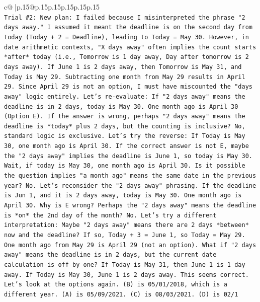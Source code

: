 \documentclass{article}
\begin{document}
{\begin{supertabular}{c@{$\;$}|p{.15\linewidth}@{}p{.15\linewidth}p{.15\linewidth}p{.15\linewidth}p{.15\linewidth}p{.15\linewidth}}
{{{\\ 
\texttt{Trial \#2: New plan: I failed because I misinterpreted the phrase "2 days away." I assumed it meant the deadline is on the second day from today (Today + 2 = Deadline), leading to Today = May 30. However, in date arithmetic contexts, "X days away" often implies the count starts *after* today (i.e., Tomorrow is 1 day away, Day after tomorrow is 2 days away). If June 1 is 2 days away, then Tomorrow is May 31, and Today is May 29. Subtracting one month from May 29 results in April 29. Since April 29 is not an option, I must have miscounted the "days away" logic entirely. Let's re{-}evaluate: If "2 days away" means the deadline is in 2 days, today is May 30. One month ago is April 30 (Option E). If the answer is wrong, perhaps "2 days away" means the deadline is *today* plus 2 days, but the counting is inclusive? No, standard logic is exclusive. Let's try the reverse: If Today is May 30, one month ago is April 30. If the correct answer is not E, maybe the "2 days away" implies the deadline is June 1, so today is May 30. Wait, if today is May 30, one month ago is April 30. Is it possible the question implies "a month ago" means the same date in the previous year? No. Let's reconsider the "2 days away" phrasing. If the deadline is Jun 1, and it is 2 days away, today is May 30. One month ago is April 30. Why is E wrong? Perhaps the "2 days away" means the deadline is *on* the 2nd day of the month? No. Let's try a different interpretation: Maybe "2 days away" means there are 2 days *between* now and the deadline? If so, Today + 3 = June 1, so Today = May 29. One month ago from May 29 is April 29 (not an option). What if "2 days away" means the deadline is in 2 days, but the current date calculation is off by one? If Today is May 31, then June 1 is 1 day away. If Today is May 30, June 1 is 2 days away. This seems correct. Let's look at the options again. (B) is 05/01/2018, which is a different year. (A) is 05/09/2021. (C) is 08/03/2021. (D) is 02/1} \\
\\ 
}}}
\end{supertabular}}
\end{document}
